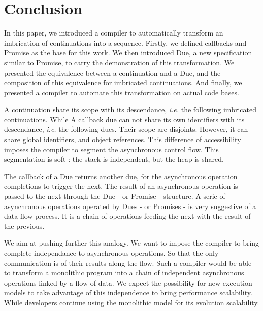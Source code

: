 \section{Conclusion}

In this paper, we introduced a compiler to automatically transform an imbrication of continuations into a sequence.
Firstly, we defined callbacks and Promise as the base for this work.
We then introduced Due, a new specification similar to Promise, to carry the demonstration of this transformation.
We presented the equivalence between a continuation and a Due, and the composition of this equivalence for imbricated continuations.
And finally, we presented a compiler to automate this transformation on actual code bases.

A continuation share its scope with its descendance, \textit{i.e.} the following imbricated continuations.
While A callback due can not share its own identifiers with its descendance, \textit{i.e.} the following dues.
Their scope are disjoints.
However, it can share global identifiers, and object references.
This difference of accessibility imposes the compiler to segment the asynchronous control flow.
This segmentation is soft : the stack is independent, but the heap is shared.

The callback of a Due returns another due, for the asynchronous operation completions to trigger the next.
The result of an asynchronous operation is passed to the next through the Due - or Promise - structure.
A serie of asynchronous operations operated by Dues - or Promises - is very suggestive of a data flow process.
It is a chain of operations feeding the next with the result of the previous.

We aim at pushing further this analogy.
We want to impose the compiler to bring complete independance to asynchronous operations.
So that the only communication is of their results along the flow.
Such a compiler would be able to transform a monolithic program into a chain of independent asynchronous operations linked by a flow of data.
We expect the possibility for new execution models to take advantage of this independence to bring performance scalability.
While developers continue using the monolithic model for its evolution scalability.